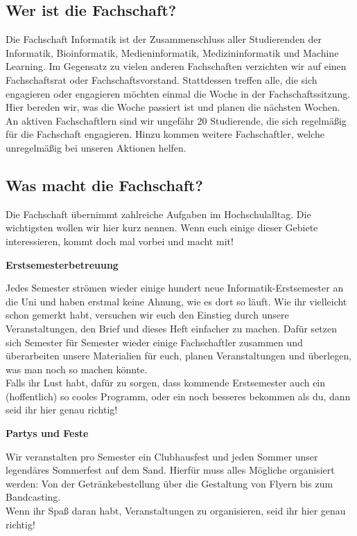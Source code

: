 \subsection{Wer ist die Fachschaft?}
Die Fachschaft Informatik ist der Zusammenschluss aller Studierenden der
Informatik, Bioinformatik, Medieninformatik, Medizininformatik und Machine Learning. 
Im Gegensatz zu vielen anderen Fachschaften verzichten wir auf einen
Fachschaftsrat oder Fachschaftsvorstand. Stattdessen treffen alle, die sich
engagieren oder engagieren möchten einmal die Woche in der Fachschaftssitzung.
Hier bereden wir, was die Woche passiert ist und planen die nächsten Wochen. An
aktiven Fachschaftlern sind wir ungefähr 20 Studierende, die sich regelmäßig
für die Fachschaft engagieren. Hinzu kommen weitere Fachschaftler, welche
unregelmäßig bei unseren Aktionen helfen.

\subsection{Was macht die Fachschaft?}
Die Fachschaft übernimmt zahlreiche Aufgaben im Hochschulalltag. Die
wichtigsten wollen wir hier kurz nennen. Wenn euch einige dieser Gebiete
interessieren, kommt doch mal vorbei und macht mit!

\textbf{Erstsemesterbetreuung}

Jedes Semester strömen wieder einige hundert neue Informatik-Erstsemester an
die Uni und haben erstmal keine Ahnung, wie es dort so läuft. Wie ihr
vielleicht schon gemerkt habt, versuchen wir euch den Einstieg durch unsere
Veranstaltungen, den Brief und dieses Heft einfacher zu machen. Dafür setzen
sich Semester für Semester wieder einige Fachschaftler zusammen und
überarbeiten unsere Materialien für euch, planen Veranstaltungen und überlegen,
was man noch so machen könnte.\\ 
Falls ihr Lust habt, dafür zu sorgen, dass kommende Erstsemester auch ein
(hoffentlich) so cooles Programm, oder ein noch besseres bekommen als du, dann
seid ihr hier genau richtig!

\textbf{Partys und Feste}

Wir veranstalten pro Semester ein Clubhausfest und jeden Sommer unser
legendäres Sommerfest auf dem Sand. Hierfür muss alles Mögliche organisiert
werden: Von der Getränkebestellung über die Gestaltung von Flyern bis zum
Bandcasting. \\
Wenn ihr Spaß daran habt, Veranstaltungen zu organisieren, seid ihr hier genau
richtig!

